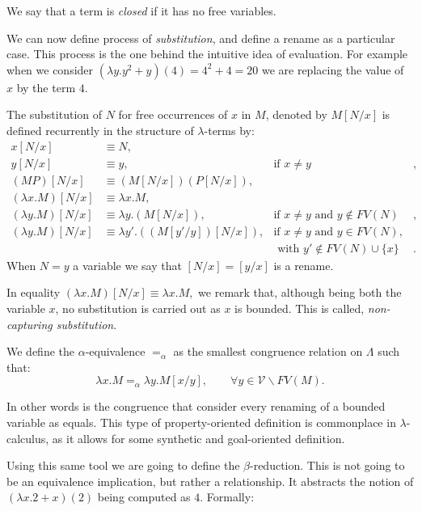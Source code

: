 \begin{definition}
  We say that a term is \emph{closed} if it has no free variables.
\end{definition}
We can now define process of \emph{substitution}, and define a rename as a particular case. This process is the one behind the intuitive idea of evaluation. For example when we consider $(\lambda y. y^2+y)(4) = 4^2+4 = 20$ we are replacing the value of $x$ by the term $4$. 
\begin{definition}\label{def:substition}
  The substitution of $N$ for free occurrences of $x$ in $M$, denoted by $M[N/x]$ is defined recurrently in the structure of $\lambda$-terms by:
  \begin{align*}
    x[N/x]& \equiv N,\\
    y[N/x]& \equiv y, &  \text{if } x\ne y&,\\
    (MP)[N/x]& \equiv (M[N/x])(P[N/x]),\\
    (\lambda x.M)[N/x] & \equiv \lambda x.M,\\
    (\lambda y.M)[N/x] & \equiv \lambda y.(M[N/x]), & \text{if } x\ne y \text{ and } y \not \in FV(N)&,\\
    (\lambda y.M)[N/x] & \equiv \lambda y'.((M[y'/y])[N/x]), & \text{if } x\ne y \text{ and } y\in FV(N),\\
          & & \text{ with } y' \not \in FV(N) \cup \{x\}&.
  \end{align*}
  When $N = y$ a variable we say that $[N/x] = [y/x]$ is a rename. 
\end{definition}
\begin{remark}
  In equality $  (\lambda x.M)[N/x]  \equiv \lambda x.M,$ we remark that, although being both the variable $x$, no substitution is carried out as $x$ is bounded. This is called, \emph{non-capturing substitution}.
\end{remark}

\begin{definition}
  We define the $\alpha$-equivalence $=_\alpha$ as the smallest congruence relation on $\Lambda$ such that:
  $$\lambda x. M =_\alpha \lambda y. M[x/y], \qquad \forall y \in \mathcal{V} \backslash FV(M).$$
\end{definition}
In other words is the congruence that consider every renaming of a bounded variable as equals. This type of property-oriented definition is commonplace in $\lambda$-calculus, as it allows for some synthetic and goal-oriented definition. 



Using this same tool we are going to define the $\beta$-reduction. This is not going to be an equivalence implication, but rather a relationship. It abstracts the notion of  $(\lambda x. 2+x)(2)$  being computed as $4$. Formally:

